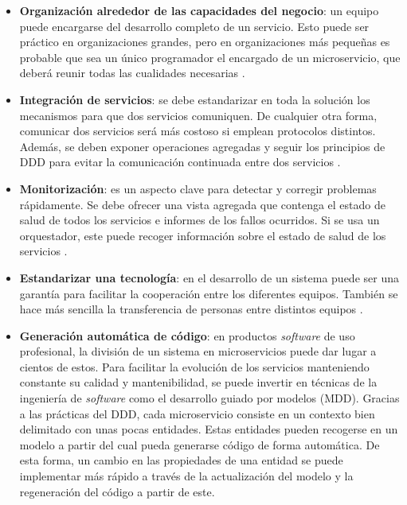 \documentclass[11pt,spanish,listoffigures]{tfgetsinf}
\begin{document}
\begin{itemize}

\item \textbf{Organización alrededor de las capacidades del negocio}: un equipo puede encargarse del desarrollo completo de un servicio. Esto puede ser práctico en organizaciones grandes, pero en organizaciones más pequeñas es probable que sea un único programador el encargado de un microservicio, que deberá reunir todas las cualidades necesarias \cite{Newman2015a, Lewis2014, DelaTorre2018, Hunter2017}.

\item \textbf{Integración de servicios}: se debe estandarizar en toda la solución los mecanismos para que dos servicios comuniquen. De cualquier otra forma, comunicar dos servicios será más costoso si emplean protocolos distintos. Además, se deben exponer operaciones agregadas y seguir los principios de DDD para evitar la comunicación continuada entre dos servicios \cite{Newman2015a, DelaTorre2018}.

\item \textbf{Monitorización}: es un aspecto clave para detectar y corregir problemas rápidamente. Se debe ofrecer una vista agregada que contenga el estado de salud  de todos los servicios e informes de los fallos ocurridos. Si se usa un orquestador, este puede recoger información sobre el estado de salud de los servicios \cite{Newman2015a, DelaTorre2018}.

\item \textbf{Estandarizar una tecnología}: en el desarrollo de un sistema puede ser una garantía para facilitar la cooperación entre los diferentes equipos. También se hace más sencilla la transferencia de personas entre distintos equipos \cite{Newman2015a}.

\item \textbf{Generación automática de código}: en productos \textit{software} de uso profesional, la división de un sistema en microservicios puede dar lugar a cientos de estos. Para facilitar la evolución de los servicios manteniendo constante su calidad y mantenibilidad, se puede invertir en técnicas de la ingeniería de \textit{software} como el desarrollo guiado por modelos (MDD). Gracias a las prácticas del DDD, cada microservicio consiste en un contexto bien delimitado con unas pocas entidades. Estas entidades pueden recogerse en un modelo a partir del cual pueda generarse código de forma automática. De esta forma, un cambio en las propiedades de una entidad se puede implementar más rápido a través de la actualización del modelo y la regeneración del código a partir de este.

\end{itemize}
\end{document}
